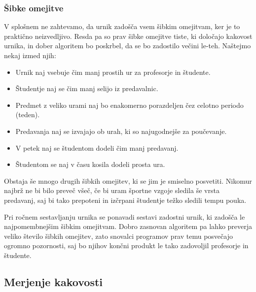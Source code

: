 \documentclass[a4paper]{article}
\begin{document}
\subsubsection{Šibke omejitve} %

V splošnem ne zahtevamo, da urnik zadošča vsem šibkim omejitvam, ker je to praktično neizvedljivo.
Resda pa so prav šibke omejitve tiste, ki določajo kakovost urnika, in dober algoritem bo
poskrbel, da se bo zadostilo večini le-teh. Naštejmo nekaj izmed njih:


\begin{itemize}
      \item Urnik naj vsebuje čim manj prostih ur za profesorje in študente.
      \item Študentje naj se čim manj selijo iz predavalnic.
      \item Predmet z veliko urami naj bo enakomerno porazdeljen čez celotno periodo (teden).
      \item Predavanja naj se izvajajo ob urah, ki so najugodnejše za poučevanje.
      \item V petek naj se študentom dodeli čim manj predavanj.
      \item Študentom se naj v času kosila dodeli prosta ura.
\end{itemize}
%
Obstaja še mnogo drugih šibkih omejitev, ki se jim je smiselno posvetiti. Nikomur najbrž ne
bi bilo preveč všeč, če bi uram športne vzgoje sledila še vrsta predavanj, saj bi tako
prepoteni in izčrpani študentje težko sledili tempu pouka.

Pri ročnem sestavljanju urnika se ponavadi sestavi zadostni urnik, ki zadošča le
najpomembnejšim šibkim omejitvam. Dobro zasnovan algoritem pa lahko preverja veliko
število šibkih omejitev, zato snovalci programov prav temu posvečajo ogromno pozornosti,
saj bo njihov končni produkt le tako zadovoljil profesorje in študente.

\subsection{Merjenje kakovosti} %
\end{document}
